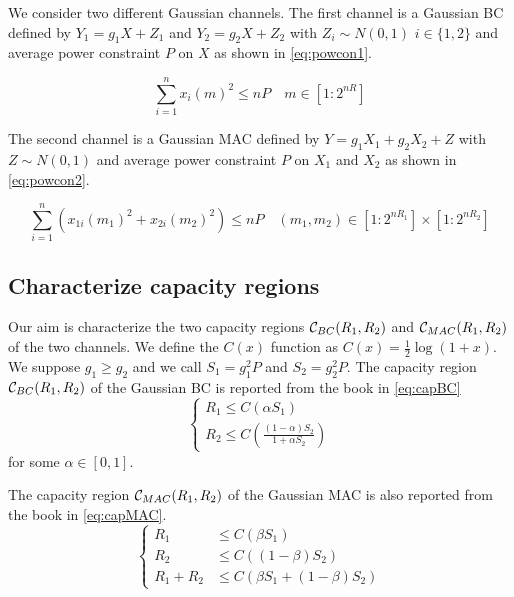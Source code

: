 
We consider two different Gaussian channels. The first channel is a Gaussian BC defined by $Y_1 = g_1 X + Z_1$  and $Y_2 = g_2 X + Z_2$ with $Z_i \sim N(0,1)$ $i \in \{1,2\}$ and average power constraint $P$ on $X$ as shown in \eqref{eq:powcon1}.

\begin{equation}
	\sum_{i=1}^n x_i(m)^2 \leq nP \quad m \in [1:2^{nR}]
	\label{eq:powcon1}
\end{equation}

The second channel is a Gaussian MAC defined by $Y = g_1 X_1 + g_2 X_2 + Z$ with $Z \sim N(0,1)$ and average power constraint $P$ on $X_1$ and $X_2$ as shown in \eqref{eq:powcon2}.

\begin{equation}
	\sum_{i=1}^n \left( x_{1i}(m_1)^2 + x_{2i}(m_2)^2 \right) \leq nP \quad (m_1,m_2) \in [1:2^{nR_1}] \times [1:2^{nR_2}]
	\label{eq:powcon2}
\end{equation}

\subsection{Characterize capacity regions}

Our aim is characterize the two capacity regions $\mathcal{C}_{BC}(R_1, R_2)$ and $\mathcal{C}_{MAC}(R_1, R_2)$ of the two channels. We define the $C(x)$ function as $C(x)=\frac{1}{2}\log(1+x)$. We suppose $g_1 \geq g_2$ and we call $S_1=g_1^2P$ and $S_2=g_2^2P$. The capacity region $\mathcal{C}_{BC}(R_1, R_2)$ of the Gaussian BC is reported from the book in \eqref{eq:capBC}
%
\begin{equation}
	\begin{cases}
		R_1 \leq C(\alpha S_1) \\
		R_2 \leq C\left(\frac{(1-\alpha)S_2}{1+\alpha S_2}\right)
	\end{cases}
	\label{eq:capBC}
\end{equation}
%
for some $\alpha \in [0,1]$.

The capacity region $\mathcal{C}_{MAC}(R_1, R_2)$ of the Gaussian MAC is also reported from the book in \eqref{eq:capMAC}.
%
\begin{equation}
	\begin{cases}
		R_1 &\leq C(\beta S_1) \\
		R_2 &\leq C((1-\beta) S_2) \\
		R_1 + R_2 &\leq C(\beta S_1 + (1-\beta)S_2)
	\end{cases}
	\label{eq:capMAC}
\end{equation}

